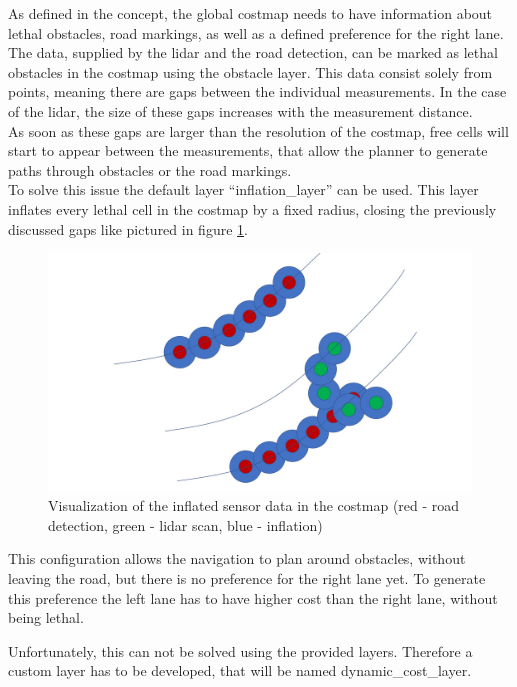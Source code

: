 As defined in the concept, the global costmap needs to have information about lethal obstacles, road markings, as well as a defined preference for the right lane.\\


The data, supplied by the lidar and the road detection, can be marked as lethal obstacles in the costmap using the obstacle layer. This data consist solely from points, meaning there are gaps between the individual measurements. In the case of the lidar, the size of these gaps increases with the measurement distance.\\

As soon as these gaps are larger than the resolution of the costmap, free cells will start to appear between the measurements, that allow the planner to generate paths through obstacles or the road markings.\\

To solve this issue the default layer ``inflation\_layer'' can be used. This layer inflates every lethal cell in the costmap by a fixed radius, closing the previously discussed gaps like pictured in figure \ref{costinfl}.\\

\begin{figure} 
	\centering
	\includegraphics[width=.7\textwidth]{Pictures/costmap inflation}
	\caption{Visualization of the inflated sensor data in the costmap (red - road detection, green - lidar scan, blue - inflation)}
	\label{costinfl}
\end{figure}

This configuration allows the navigation to plan around obstacles, without leaving the road, but there is no preference for the right lane yet. To generate this preference the left lane has to have higher cost than the right lane, without being lethal.

Unfortunately, this can not be solved using the provided layers. Therefore a custom layer has to be developed, that will be named dynamic\_cost\_layer.

